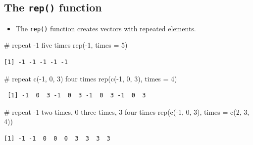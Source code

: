 \documentclass[
  letterpaper,
  DIV=11,
  numbers=noendperiod]{scrreprt}
\newenvironment{Shaded}{\begin{snugshade}}{\end{snugshade}}
\newcommand{\AttributeTok}[1]{\textcolor[rgb]{0.40,0.45,0.13}{#1}}
\newcommand{\CommentTok}[1]{\textcolor[rgb]{0.37,0.37,0.37}{#1}}
\newcommand{\DecValTok}[1]{\textcolor[rgb]{0.68,0.00,0.00}{#1}}
\newcommand{\FunctionTok}[1]{\textcolor[rgb]{0.28,0.35,0.67}{#1}}
\newcommand{\NormalTok}[1]{\textcolor[rgb]{0.00,0.23,0.31}{#1}}
\newcommand{\SpecialCharTok}[1]{\textcolor[rgb]{0.37,0.37,0.37}{#1}}
\providecommand{\tightlist}{%
  \setlength{\itemsep}{0pt}\setlength{\parskip}{0pt}}\usepackage{longtable,booktabs,array}
\begin{document}
\subsection{\texorpdfstring{The \texttt{rep()}
function}{The rep() function}}\label{the-rep-function}

\begin{itemize}
\tightlist
\item
  The \texttt{rep()} function creates vectors with repeated elements.
\end{itemize}

\begin{Shaded}
\begin{Highlighting}[]
\CommentTok{\# repeat {-}1 five times}
\FunctionTok{rep}\NormalTok{(}\SpecialCharTok{{-}}\DecValTok{1}\NormalTok{, }\AttributeTok{times =} \DecValTok{5}\NormalTok{)                      }
\end{Highlighting}
\end{Shaded}

\begin{verbatim}
[1] -1 -1 -1 -1 -1
\end{verbatim}

\begin{Shaded}
\begin{Highlighting}[]
\CommentTok{\# repeat c({-}1, 0, 3) four times}
\FunctionTok{rep}\NormalTok{(}\FunctionTok{c}\NormalTok{(}\SpecialCharTok{{-}}\DecValTok{1}\NormalTok{, }\DecValTok{0}\NormalTok{, }\DecValTok{3}\NormalTok{), }\AttributeTok{times =} \DecValTok{4}\NormalTok{)             }
\end{Highlighting}
\end{Shaded}

\begin{verbatim}
 [1] -1  0  3 -1  0  3 -1  0  3 -1  0  3
\end{verbatim}

\begin{Shaded}
\begin{Highlighting}[]
\CommentTok{\# repeat {-}1 two times, 0 three times, 3 four times}
\FunctionTok{rep}\NormalTok{(}\FunctionTok{c}\NormalTok{(}\SpecialCharTok{{-}}\DecValTok{1}\NormalTok{, }\DecValTok{0}\NormalTok{, }\DecValTok{3}\NormalTok{), }\AttributeTok{times =} \FunctionTok{c}\NormalTok{(}\DecValTok{2}\NormalTok{, }\DecValTok{3}\NormalTok{, }\DecValTok{4}\NormalTok{))    }
\end{Highlighting}
\end{Shaded}

\begin{verbatim}
[1] -1 -1  0  0  0  3  3  3  3
\end{verbatim}
\end{document}
